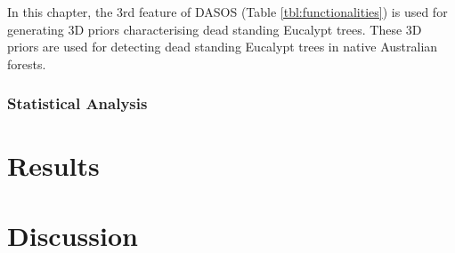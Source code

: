 \documentclass{subfiles}
\begin{document}
\par In this chapter, the 3rd feature of DASOS (Table \ref{tbl:functionalities}) is used for generating 3D priors characterising dead standing Eucalypt trees. These 3D priors are used for detecting dead standing Eucalypt trees in native Australian forests. 

\subsubsection{Statistical Analysis}

\section{Results} 

		
		
\section{Discussion}
\end{document}
